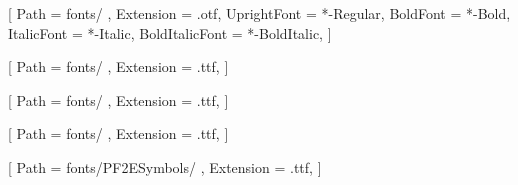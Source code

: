 \setmainfont{STIXTwoText}[
    Path = fonts/ ,
    Extension = .otf,
    UprightFont = *-Regular,
    BoldFont = *-Bold,
    ItalicFont = *-Italic,
    BoldItalicFont = *-BoldItalic,
]

[
    Path = fonts/ ,
    Extension = .ttf,
]

[
    Path = fonts/ ,
    Extension = .ttf,
]

[
    Path = fonts/ ,
    Extension = .ttf,
]

[
    Path = fonts/PF2ESymbols/ ,
    Extension = .ttf,
]
